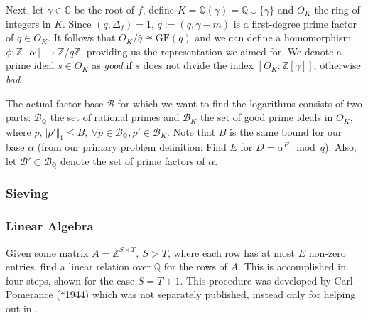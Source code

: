 \documentclass[paper=a4, fontsize=11pt]{scrartcl} %
\numberwithin{equation}{section} %
\numberwithin{figure}{section} %
\numberwithin{table}{section} %
\begin{document}
Next, let $\gamma\in\mathbb{C}$ be the root of $f$, define $K = \mathbb{Q}(\gamma) = \mathbb{Q}\cup\{\gamma\}$ and $O_K$ the ring of integers in $K$. Since $(q,\Delta_f) = 1$, $\hat{q}:=(q,\gamma-m)$ is a first-degree prime factor of $q\in O_K$. It follows that $O_K/\hat{q}\cong\mathrm{GF}(q)$ and we can define a homomorphism $\phi:\mathbb{Z}[\alpha]\rightarrow\mathbb{Z}/q\mathbb{Z}$, providing us the representation we aimed for. We denote a prime ideal $s\in O_K$ as \textit{good} if $s$ does not divide the index $[O_K:\mathbb{Z}[\gamma]]$, otherwise \textit{bad}.

The actual factor base $\mathcal{B}$ for which we want to find the logarithms consists of two parts: $\mathcal{B}_\mathbb{Q}$ the set of rational primes and $\mathcal{B}_K$ the set of good prime ideals in $O_K$, where $p,\Vert p'\Vert_1\leq B,\ \forall p\in\mathcal{B}_\mathbb{Q},p'\in\mathcal{B}_K$. Note that $B$ is the same bound for our base $\alpha$ (from our primary problem definition: Find $E$ for $D=\alpha^E\mod q$). Also, let $\mathcal{B}'\subset\mathcal{B}_\mathbb{Q}$ denote the set of prime factors of $\alpha$.

\subsubsection{Sieving}

\subsubsection{Linear Algebra}
Given some matrix $A = \mathbb{Z}^{S\times T},\ S > T$, where each row has at most $E$ non-zero entries, find a linear relation over $\mathbb{Q}$ for the rows of $A$. This is accomplished in four steps, shown for the case $S=T+1$. This procedure was developed by Carl Pomerance (*1944) which was not separately published, instead only for helping out in \citep{gordon1993discrete}.
\end{document}
